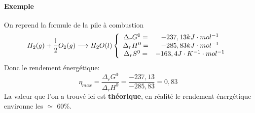 \documentclass[10pt,a4paper]{book}
\begin{document}
\subsubsection{Exemple}
On reprend la formule de la pile à combustion 
\[H_2(g) + \frac{1}{2}O_2(g)\longrightarrow H_2O (l) \left\lbrace \begin{array}{c c}
\Delta_rG^0 = & -237,13 kJ\cdot mol^{-1}\\
\Delta_rH^0 = & -285,83 kJ\cdot mol^{-1}\\
\Delta_rS^0 = & -163,4 J\cdot K^{-1}\cdot mol^{-1}
\end{array} \right.\]
Donc le rendement énergétique:
\[\eta_{max} = \frac{\Delta_rG^0}{\Delta_rH^0}= \frac{-237,13}{-285,83} = 0,83\]
La valeur que l'on a trouvé ici est \textbf{théorique}, en réalité le rendement énergétique environne les $\simeq$ 60\%.

\chapter*{}

\end{document}
